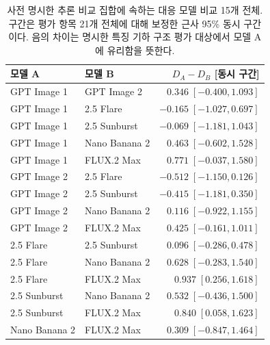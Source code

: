 \documentclass[11pt,a4paper]{article}
\begin{document}
\begin{table}[H]
\centering\small
\begin{tabular}{@{}llr@{}}
\toprule
모델 A & 모델 B & $D_A-D_B$ [동시 구간]\\\midrule
GPT Image 1 & GPT Image 2 & $0.346\;[-0.400,1.093]$\\
GPT Image 1 & 2.5 Flare & $-0.165\;[-1.027,0.697]$\\
GPT Image 1 & 2.5 Sunburst & $-0.069\;[-1.181,1.043]$\\
GPT Image 1 & Nano Banana 2 & $0.463\;[-0.602,1.528]$\\
GPT Image 1 & FLUX.2 Max & $0.771\;[-0.037,1.580]$\\
GPT Image 2 & 2.5 Flare & $-0.512\;[-1.150,0.126]$\\
GPT Image 2 & 2.5 Sunburst & $-0.415\;[-1.181,0.350]$\\
GPT Image 2 & Nano Banana 2 & $0.116\;[-0.922,1.155]$\\
GPT Image 2 & FLUX.2 Max & $0.425\;[-0.161,1.011]$\\
2.5 Flare & 2.5 Sunburst & $0.096\;[-0.286,0.478]$\\
2.5 Flare & Nano Banana 2 & $0.628\;[-0.283,1.540]$\\
2.5 Flare & FLUX.2 Max & $0.937\;[0.256,1.618]$\\
2.5 Sunburst & Nano Banana 2 & $0.532\;[-0.436,1.500]$\\
2.5 Sunburst & FLUX.2 Max & $0.840\;[0.058,1.623]$\\
Nano Banana 2 & FLUX.2 Max & $0.309\;[-0.847,1.464]$\\
\bottomrule
\end{tabular}
\caption{사전 명시한 추론 비교 집합에 속하는 대응 모델 비교 15개 전체. 구간은 평가 항목 21개 전체에 대해 보정한 근사 95\% 동시 구간이다. 음의 차이는 명시한 특징 기하 구조 평가 대상에서 모델 A에 유리함을 뜻한다.}
\label{tab:all-specificity-pairs}
\end{table}
\end{document}
